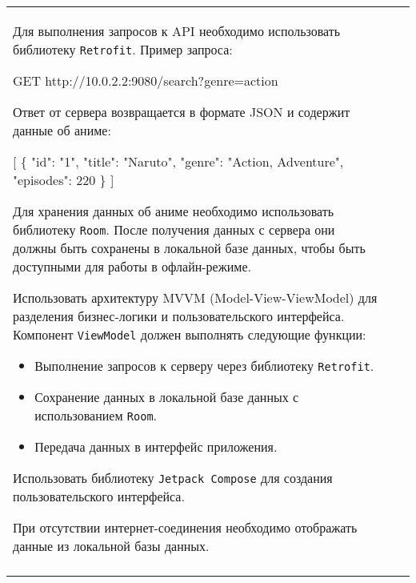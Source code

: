 \documentclass[a4paper]{article}
\begin{document}
\begin{tabular}{!{\vrule width 2pt}p{5cm}|p{6cm}|p{4cm}!{\vrule width 2pt}}
{\begin{minipage}{16cm}
\begin{enumerate}

Для выполнения запросов к API необходимо использовать библиотеку \texttt{Retrofit}. Пример запроса:


GET http://10.0.2.2:9080/search?genre=action


Ответ от сервера возвращается в формате JSON и содержит данные об аниме:


[
  \{
    "id": "1",
    "title": "Naruto",
    "genre": "Action, Adventure",
    "episodes": 220
  \}
]


Для хранения данных об аниме необходимо использовать библиотеку \texttt{Room}. После получения данных с сервера они должны быть сохранены в локальной базе данных, чтобы быть доступными для работы в офлайн-режиме.

Использовать архитектуру MVVM (Model-View-ViewModel) для разделения бизнес-логики и пользовательского интерфейса. Компонент \texttt{ViewModel} должен выполнять следующие функции:
\begin{itemize}
    \item Выполнение запросов к серверу через библиотеку \texttt{Retrofit}.
    \item Сохранение данных в локальной базе данных с использованием \texttt{Room}.
    \item Передача данных в интерфейс приложения.
\end{itemize}

Использовать библиотеку \texttt{Jetpack Compose} для создания пользовательского интерфейса.

При отсутствии интернет-соединения необходимо отображать данные из локальной базы данных. 
\end{enumerate}

\vspace{0.2cm}
    
\end{minipage}
}
\\
\end{tabular}
\end{document}
